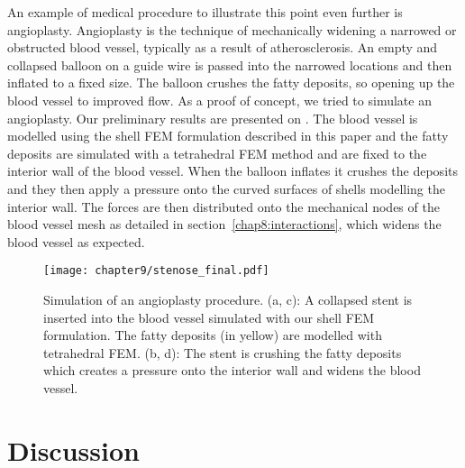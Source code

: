 An example of medical procedure to illustrate this point even further is angioplasty. Angioplasty is the technique of mechanically widening a narrowed or obstructed blood vessel, typically as a result of atherosclerosis. An empty and collapsed balloon on a guide wire is passed into the narrowed locations and then inflated to a fixed size. The balloon crushes the fatty deposits, so opening up the blood vessel to improved flow. As a proof of concept, we tried to simulate an angioplasty. Our preliminary results are presented on . The blood vessel is modelled using the shell FEM formulation described in this paper and the fatty deposits are simulated with a tetrahedral FEM method and are fixed to the interior wall of the blood vessel. When the balloon inflates it crushes the deposits and they then apply a pressure onto the curved surfaces of shells modelling the interior wall. The forces are then distributed onto the mechanical nodes of the blood vessel mesh as detailed in section~\ref{chap8:interactions}, which widens the blood vessel as expected. 
%
\begin{figure}[ht]
\centering
\texttt{[image: chapter9/stenose\_final.pdf]}
\caption[Simulation of an angioplasty procedure]{Simulation of an angioplasty procedure. (a, c): A collapsed stent is inserted into the blood vessel simulated with our shell FEM formulation. The fatty deposits (in yellow) are modelled with tetrahedral FEM. (b, d): The stent is crushing the fatty deposits which creates a pressure onto the interior wall and widens the blood vessel.}
\label{chap9:fig-stent}
\end{figure}

\section{Discussion}

